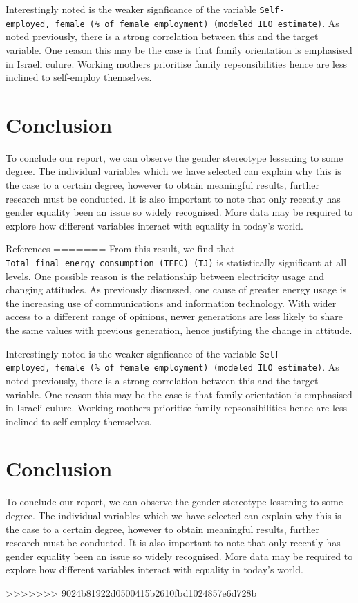 \documentclass[11pt,a4paper,]{article}
\begin{document}
Interestingly noted is the weaker signficance of the variable
\texttt{Self-employed,\ female\ (\%\ of\ female\ employment)\ (modeled\ ILO\ estimate)}.
As noted previously, there is a strong correlation between this and the
target variable. One reason this may be the case is that family
orientation is emphasised in Israeli culure. Working mothers prioritise
family repsonsibilities hence are less inclined to self-employ
themselves.

\section*{Conclusion}

To conclude our report, we can observe the gender stereotype lessening
to some degree. The individual variables which we have selected can
explain why this is the case to a certain degree, however to obtain
meaningful results, further research must be conducted. It is also
important to note that only recently has gender equality been an issue
so widely recognised. More data may be required to explore how different
variables interact with equality in today's world.

References
=======
From this result, we find that \texttt{Total\ final\ energy\ consumption\ (TFEC)\ (TJ)} is statistically significant at all levels. One possible reason is the relationship between electricity usage and changing attitudes. As previously discussed, one cause of greater energy usage is the increasing use of communications and information technology. With wider access to a different range of opinions, newer generations are less likely to share the same values with previous generation, hence justifying the change in attitude.

Interestingly noted is the weaker signficance of the variable \texttt{Self-employed,\ female\ (\%\ of\ female\ employment)\ (modeled\ ILO\ estimate)}. As noted previously, there is a strong correlation between this and the target variable. One reason this may be the case is that family orientation is emphasised in Israeli culure. Working mothers prioritise family repsonsibilities hence are less inclined to self-employ themselves.

\section*{Conclusion}

To conclude our report, we can observe the gender stereotype lessening to some degree. The individual variables which we have selected can explain why this is the case to a certain degree, however to obtain meaningful results, further research must be conducted. It is also important to note that only recently has gender equality been an issue so widely recognised. More data may be required to explore how different variables interact with equality in today's world.

\pagebreak
>>>>>>> 9024b81922d0500415b2610fbd1024857e6d728b

\printbibliography
\end{document}
